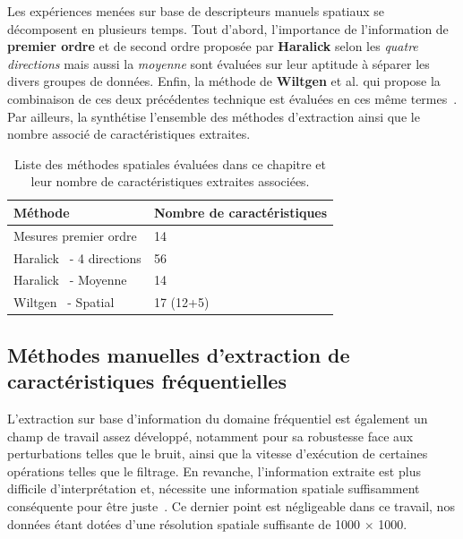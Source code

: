 Les expériences menées sur base de descripteurs manuels spatiaux se décomposent en plusieurs temps. Tout d'abord, l'importance de l'information de \textbf{premier ordre} et de second ordre proposée par \textbf{Haralick} selon les \textit{quatre directions} mais aussi la \textit{moyenne} sont évaluées sur leur aptitude à séparer les divers groupes de données. Enfin, la méthode de \textbf{Wiltgen} et al. qui propose la combinaison de ces deux précédentes technique est évaluées en ces même termes~\cite{Wiltgen2008}. Par ailleurs, la  synthétise l'ensemble des méthodes d'extraction ainsi que le nombre associé de caractéristiques extraites.\par
\begin{table}[h]
    \centering
    \begin{tabular}{ll}
        \toprule
        \textbf{Méthode}                            & \textbf{Nombre de caractéristiques}   \\ \hline
        Mesures premier ordre                       & 14                                    \\ \hline
        Haralick~\cite{Haralick1973} - 4 directions & 56                                    \\ \hline
        Haralick~\cite{Haralick1973} - Moyenne      & 14                                    \\ \hline
        Wiltgen~\cite{Wiltgen2008} - Spatial        & 17 (12+5)                             \\
        \bottomrule                 
    \end{tabular}
    \caption{Liste des méthodes spatiales évaluées dans ce chapitre et leur nombre de caractéristiques extraites associées.}
    \label{tab:number_features_spatial}
\end{table}
\clearpage

\subsection{Méthodes manuelles d'extraction de caractéristiques fréquentielles}
L'extraction sur base d'information du domaine fréquentiel est également un champ de travail assez développé, notamment pour sa robustesse face aux perturbations telles que le bruit, ainsi que la vitesse d'exécution de certaines opérations telles que le filtrage. En revanche, l'information extraite est plus difficile d'interprétation et, nécessite une information spatiale suffisamment conséquente pour être juste~\cite{Kamila2015}. Ce dernier point est négligeable dans ce travail, nos données étant dotées d'une résolution spatiale suffisante de \SI{1000}{\px} $\times$ \SI{1000}{\px}.\par

